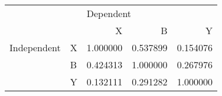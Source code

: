 \begin{tabular}{llrrr}
\toprule
            &   & \multicolumn{3}{l}{Dependent} \\
            &   &         X &         B &         Y \\
\midrule
Independent & X &  1.000000 &  0.537899 &  0.154076 \\
            & B &  0.424313 &  1.000000 &  0.267976 \\
            & Y &  0.132111 &  0.291282 &  1.000000 \\
\bottomrule
\end{tabular}
